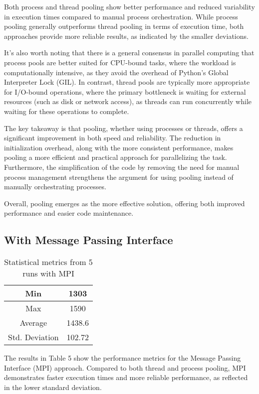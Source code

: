 \documentclass[a4paper, oneside]{article}
\begin{document}
Both process and thread pooling show better performance and reduced variability in execution times compared to manual process orchestration. While process pooling generally outperforms thread pooling in terms of execution time, both approaches provide more reliable results, as indicated by the smaller deviations.

It's also worth noting that there is a general consensus in parallel computing that process pools are better suited for CPU-bound tasks, where the workload is computationally intensive, as they avoid the overhead of Python's Global Interpreter Lock (GIL). In contrast, thread pools are typically more appropriate for I/O-bound operations, where the primary bottleneck is waiting for external resources (such as disk or network access), as threads can run concurrently while waiting for these operations to complete.

The key takeaway is that pooling, whether using processes or threads, offers a significant improvement in both speed and reliability. The reduction in initialization overhead, along with the more consistent performance, makes pooling a more efficient and practical approach for parallelizing the task. Furthermore, the simplification of the code by removing the need for manual process management strengthens the argument for using pooling instead of manually orchestrating processes.

Overall, pooling emerges as the more effective solution, offering both improved performance and easier code maintenance.

\subsection{With Message Passing Interface}
\begin{table}[h]
    \centering
    \begin{tabular}{c | c}
        \hline
        Min            & 1303 \\
        \hline
        Max            & 1590 \\
        \hline
        Average        &  1438.6 \\
        \hline
        Std. Deviation & 102.72  \\
        \hline
    \end{tabular}
    \caption{Statistical metrics from 5 runs with MPI}
    \label{table:mpi}
\end{table}
The results in Table 5 show the performance metrics for the Message Passing Interface (MPI) approach. Compared to both thread and process pooling, MPI demonstrates faster execution times and more reliable performance, as reflected in the lower standard deviation.
\end{document}
